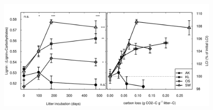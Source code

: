 \documentclass[10pt]{article}
\begin{document}
\begin{flushleft}
\newpage
\begin{figure}[!ht]
\begin{center}
\includegraphics{ligpaper-lci}
\end{center}
\end{figure}



\end{flushleft}
\end{document}
